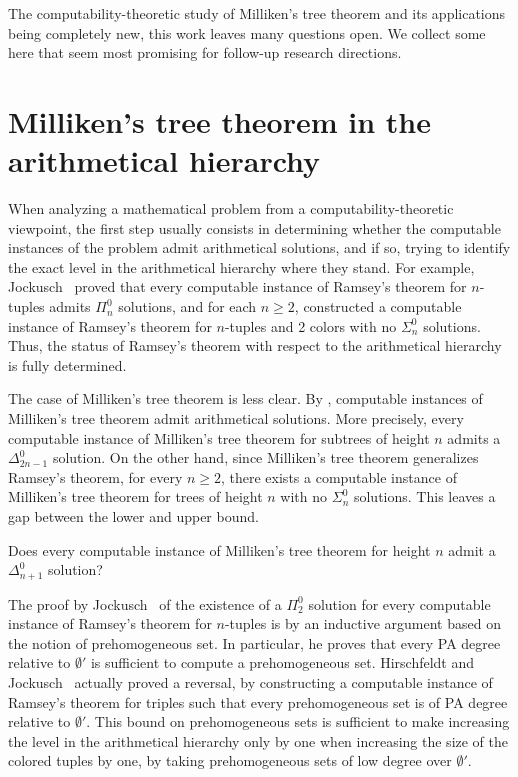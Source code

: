 
The computability-theoretic study of Milliken's tree theorem and its applications being completely new, this work leaves many questions open. We collect some here that seem most promising for follow-up research directions.


\section{Milliken's tree theorem in the arithmetical hierarchy}


When analyzing a mathematical problem from a computability-theoretic viewpoint, the first step usually consists in determining whether the computable instances of the problem admit arithmetical solutions, and if so, trying to identify the exact level in the arithmetical hierarchy where they stand. For example, Jockusch~\cite{Jockusch1972Ramseys} proved that every computable instance of Ramsey's theorem for $n$-tuples admits $\Pi^0_n$ solutions, and for each $n \geq 2$, constructed a computable instance of Ramsey's theorem for $n$-tuples and 2 colors with no $\Sigma^0_n$ solutions. Thus, the status of Ramsey's theorem with respect to the arithmetical hierarchy is fully determined. 

The case of Milliken's tree theorem is less clear. By , computable instances of Milliken's tree theorem admit arithmetical solutions. More precisely, every computable instance of Milliken's tree theorem for subtrees of height $n$ admits a $\Delta^0_{2n-1}$ solution. On the other hand, since Milliken's tree theorem generalizes Ramsey's theorem, for every $n \geq 2$, there exists a computable instance of Milliken's tree theorem for trees of height $n$ with no $\Sigma^0_n$ solutions. This leaves a gap between the lower and upper bound.


\begin{question}\label{quest:mttn-deltanp1}
Does every computable instance of Milliken's tree theorem for height $n$
admit a $\Delta^0_{n+1}$ solution?
\end{question}

The proof by Jockusch~\cite{Jockusch1972Ramseys} of the existence of a $\Pi^0_2$ solution for every computable instance of Ramsey's theorem for $n$-tuples is by an inductive argument based on the notion of prehomogeneous set. In particular, he proves that every PA degree relative to $\emptyset'$ is sufficient to compute a prehomogeneous set. Hirschfeldt and Jockusch~\cite[Theorem 2.1]{Hirschfeldt2016notions} actually proved a reversal, by constructing a computable instance of Ramsey's theorem for triples such that every prehomogeneous set is of PA degree relative to $\emptyset'$. This bound on prehomogeneous sets is sufficient to make increasing the level in the arithmetical hierarchy only by one when increasing the size of the colored tuples by one, by taking prehomogeneous sets of low degree over $\emptyset'$.

